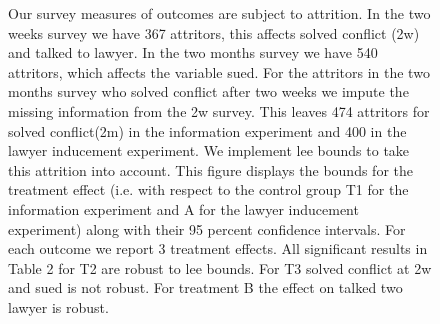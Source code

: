 \begin{figure}[H]
\begin{figurenotes}
  Our survey measures of outcomes are subject to attrition. In the two weeks survey we have 367 attritors, this affects solved conflict (2w) and talked to lawyer. In the two months survey we have 540 attritors, which affects the variable sued. For the attritors in the two months survey who solved conflict after two weeks we impute the missing information from the 2w survey. This leaves 474 attritors for solved conflict(2m) in the information experiment and 400 in the lawyer inducement experiment. We implement lee bounds to take this attrition into account. This figure displays the bounds for the treatment effect (i.e. with respect to the control group T1 for the information experiment and A for the lawyer inducement experiment) along with their 95 percent confidence intervals. For each outcome we report 3 treatment effects. All significant results in Table 2 for T2 are robust to lee bounds. For T3 solved conflict at 2w and sued is not robust. For treatment B the effect on talked two lawyer is robust.
  \end{figurenotes}
\end{figure}

